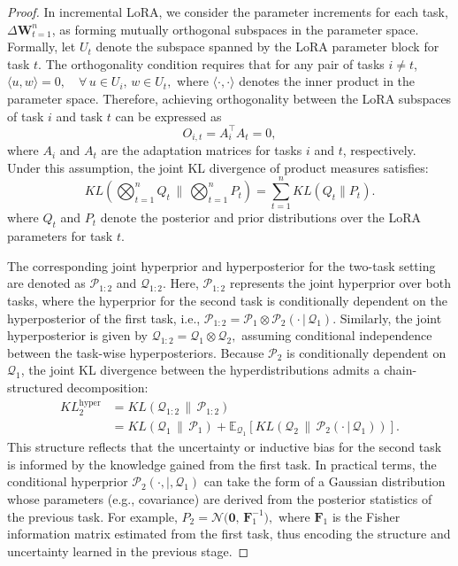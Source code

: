 \documentclass[letterpaper]{article} %
\begin{document}
\begin{proof}
In incremental LoRA, we consider the parameter increments for each task, ${\Delta\mathbf{W}}_{t=1}^n$, as forming mutually orthogonal subspaces in the parameter space. Formally, let $U_t$ denote the subspace spanned by the LoRA parameter block for task $t$. The orthogonality condition requires that for any pair of tasks $i \neq t$,
$\langle u, w \rangle = 0, \quad \forall\, u \in U_i,\, w \in U_t,$
where $\langle \cdot, \cdot \rangle$ denotes the inner product in the parameter space. Therefore, achieving orthogonality between the LoRA subspaces of task $i$ and task $t$ can be expressed as
$${O}_{i,t} = A_i^{\top} A_t = 0,$$
where $A_i$ and $A_t$ are the adaptation matrices for tasks $i$ and $t$, respectively. Under this assumption, the joint KL divergence of product measures satisfies:   \begin{equation}
      KL\left(\bigotimes_{t=1}^n Q_t \, \bigg\| \, \bigotimes_{t=1}^n P_t\right) = \sum_{t=1}^n KL(Q_t \| P_t).
  \end{equation}
where $Q_t$ and $P_t$ denote the posterior and prior distributions over the LoRA parameters for task $t$.



The corresponding joint hyperprior and hyperposterior for the two-task setting are denoted as $\mathcal{P}_{1:2}$ and $\mathcal{Q}_{1:2}$. Here, $\mathcal{P}_{1:2}$ represents the joint hyperprior over both tasks, where the hyperprior for the second task is conditionally dependent on the hyperposterior of the first task, i.e.,
$\mathcal{P}_{1:2} = \mathcal{P}_1 \otimes \mathcal{P}_2(\cdot\,|\,\mathcal{Q}_1).$
Similarly, the joint hyperposterior is given by
$\mathcal{Q}_{1:2} = \mathcal{Q}_1 \otimes \mathcal{Q}_2,$
assuming conditional independence between the task-wise hyperposteriors. Because $\mathcal{P}_2$ is conditionally dependent on $\mathcal{Q}_1$, the joint KL divergence between the hyperdistributions admits a chain-structured decomposition:
\begin{equation}
\begin{aligned}
    KL^{\text{hyper}}_2&=KL(\mathcal{Q}_{1:2}\,\|\,\mathcal{P}_{1:2})  \\
    &= KL(\mathcal{Q}_1\,\|\,\mathcal{P}_1) + \mathbb{E}_{\mathcal{Q}_1}\left[ KL(\mathcal{Q}_2\,\|\,\mathcal{P}_2(\cdot\,|\,\mathcal{Q}_1)) \right].
\end{aligned}
\end{equation}
This structure reflects that the uncertainty or inductive bias for the second task is informed by the knowledge gained from the first task. In practical terms, the conditional hyperprior $\mathcal{P}_2(\cdot,|,\mathcal{Q}_1)$ can take the form of a Gaussian distribution whose parameters (e.g., covariance) are derived from the posterior statistics of the previous task. For example,
$P_2 = \mathcal{N}\big(\mathbf{0},\, \mathbf{F}_1^{-1}\big),$
where $\mathbf{F}_1$ is the Fisher information matrix estimated from the first task, thus encoding the structure and uncertainty learned in the previous stage.



\end{proof}
\end{document}
